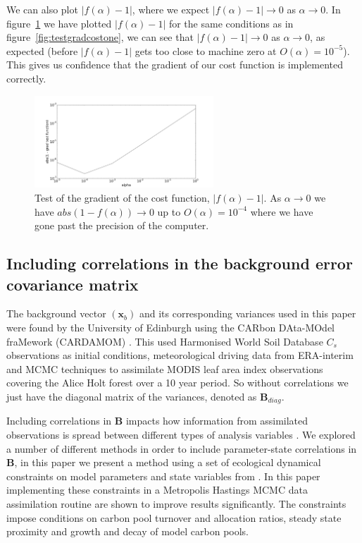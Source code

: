 \documentclass[11pt]{article}
\begin{document}
We can also plot $|f(\alpha)-1|$, where we expect $|f(\alpha)-1| \rightarrow 0$ as $\alpha \rightarrow 0$.  In figure~\ref{fig:testgradcost} we have plotted $|f(\alpha)-1|$ for the same conditions as in figure~\ref{fig:testgradcostone}, we can see that $|f(\alpha) - 1| \rightarrow 0$ as $\alpha \rightarrow 0$, as expected (before $|f(\alpha)-1|$ gets too close to machine zero at $O(\alpha) = 10^{-5}$). This gives us confidence that the gradient of our cost function is implemented correctly.
\begin{figure}[ht]
    \centering
    \includegraphics[width=0.6\textwidth]{testgradcost1.png}
    \caption{Test of the gradient of the cost function, $|f(\alpha) -1|$. As $\alpha \rightarrow 0$ we have $abs(1 - f(\alpha)) \rightarrow 0$ up to $O(\alpha) = 10^{-4}$ where we have gone past the precision of the computer.}
    \label{fig:testgradcost}
\end{figure}

\subsection{Including correlations in the background error covariance matrix} \label{sec:corB}

The background vector $(\textbf{x}_b)$ and its corresponding variances used in this paper were found by the University of Edinburgh using the CARbon DAta-MOdel fraMework (CARDAMOM) \citep{Exbrayat2015}. This used Harmonised World Soil Database $C_{s}$ observations as initial conditions, meteorological driving data from ERA-interim and MCMC techniques to assimilate MODIS leaf area index observations covering the Alice Holt forest over a 10 year period. So without correlations we just have the diagonal matrix of the variances, denoted as $\textbf{B}_{diag}$.

Including correlations in \textbf{B} impacts how information from assimilated observations is spread between different types of analysis variables \citep{Singh2011}. We explored a number of different methods in order to include parameter-state correlations in \textbf{B}, in this paper we present a method using a set of ecological dynamical constraints on model parameters and state variables from \citet{Bloom2015}. In this paper implementing these constraints in a Metropolis Hastings MCMC data assimilation routine are shown to improve results significantly. The constraints impose conditions on carbon pool turnover and allocation ratios, steady state proximity and growth and decay of model carbon pools.
\end{document}
